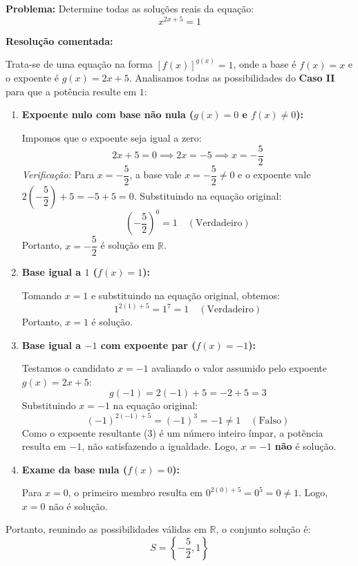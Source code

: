 \documentclass[12pt,a4paper]{report}
\begin{document}
	\textbf{Problema:} Determine todas as soluções reais da equação:
	\[
	x^{2x+5} = 1
	\]
	
	\textbf{Resolução comentada:}
	
	Trata-se de uma equação na forma $[f(x)]^{g(x)} = 1$, onde a base é $f(x) = x$ e o expoente é $g(x) = 2x + 5$. Analisamos todas as possibilidades do \textbf{Caso II} para que a potência resulte em $1$:
	
	\begin{enumerate}[label=\textbf{\arabic*ª Possibilidade:}, leftmargin=*]
		\item \textbf{Expoente nulo com base não nula ($g(x) = 0$ e $f(x) \neq 0$):}
		
		Impomos que o expoente seja igual a zero:
		\[
		2x + 5 = 0 \implies 2x = -5 \implies x = -\frac{5}{2}
		\]
		\textit{Verificação:} Para $x = -\dfrac{5}{2}$, a base vale $x = -\dfrac{5}{2} \neq 0$ e o expoente vale $2\left(-\dfrac{5}{2}\right) + 5 = -5 + 5 = 0$. Substituindo na equação original:
		\[
		\left(-\frac{5}{2}\right)^{0} = 1 \quad (\text{Verdadeiro})
		\]
		Portanto, $x = -\dfrac{5}{2}$ é solução em $\mathbb{R}$.
		
		\item \textbf{Base igual a $1$ ($f(x) = 1$):}
		
		Tomando $x = 1$ e substituindo na equação original, obtemos:
		\[
		1^{2(1) + 5} = 1^7 = 1 \quad (\text{Verdadeiro})
		\]
		Portanto, $x = 1$ é solução.
		
		\item \textbf{Base igual a $-1$ com expoente par ($f(x) = -1$):}
		
		Testamos o candidato $x = -1$ avaliando o valor assumido pelo expoente $g(x) = 2x + 5$:
		\[
		g(-1) = 2(-1) + 5 = -2 + 5 = 3
		\]
		Substituindo $x = -1$ na equação original:
		\[
		(-1)^{2(-1) + 5} = (-1)^3 = -1 \neq 1 \quad (\text{Falso})
		\]
		Como o expoente resultante ($3$) é um número inteiro ímpar, a potência resulta em $-1$, não satisfazendo a igualdade. Logo, $x = -1$ \textbf{não} é solução.
		
		\item \textbf{Exame da base nula ($f(x) = 0$):}
		
		Para $x = 0$, o primeiro membro resulta em $0^{2(0)+5} = 0^5 = 0 \neq 1$. Logo, $x = 0$ não é solução.
	\end{enumerate}
	
	Portanto, reunindo as possibilidades válidas em $\mathbb{R}$, o conjunto solução é:
	\[
	S = \left\{ -\frac{5}{2}, 1 \right\}
	\]
	
\end{document}
